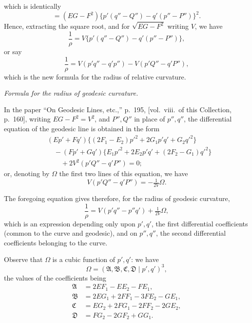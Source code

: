 \documentclass[11pt]{article}
\begin{document}
which is identically
\[
= (EG - F^2)\{p'(q'' - Q'') - q'(p'' - P'')\}^2.
\]
Hence, extracting the square root, and for $\sqrt{EG - F^2}$ writing $V$, we have
\[
\frac{1}{\rho} = V\{p'(q'' - Q'') - q'(p'' - P'')\},
\]
or say
\[
\frac{1}{\rho} = V(p'q'' - q'p'') - V(p'Q'' - q'P''),
\]
which is the new formula for the radius of relative curvature.

\begin{center}\textit{Formula for the radius of geodesic curvature.}\end{center}

In the paper ``On Geodesic Lines, etc.,'' p.\ 195, [vol.\ viii.\ of this Collection, p.\ 160],
writing $EG - F^2 = V^2$, and $P'', Q''$ in place of $p'', q''$, the differential equation of the
geodesic line is obtained in the form
\begin{align*}
& (Ep' + Fq')\{(2F_1 - E_2)p'^2 + 2G_1 p'q' + G_2 q'^2\} \\
& \quad - (Fp' + Gq')\{E_1 p'^2 + 2E_2 p'q' + (2F_2 - G_1)q'^2\} \\
& \quad\quad + 2V^2(p'Q'' - q'P'') = 0;
\end{align*}
or, denoting by $\Omega$ the first two lines of this equation, we have
\[
V(p'Q'' - q'P'') = -\tfrac{1}{2V}\Omega.
\]

The foregoing equation gives therefore, for the radius of geodesic curvature,
\[
\frac{1}{\rho} = V(p'q'' - p''q') + \tfrac{1}{2V}\Omega,
\]
which is an expression depending only upon $p', q'$, the first differential coefficients
(common to the curve and geodesic), and on $p'', q''$, the second differential coefficients
belonging to the curve.

Observe that $\Omega$ is a cubic function of $p', q'$: we have
\[
\Omega = (\mathfrak{A}, \mathfrak{B}, \mathfrak{C}, \mathfrak{D} \mid p', q')^3,
\]
the values of the coefficients being
\begin{align*}
\mathfrak{A} &= 2EF_1 - EE_2 - FE_1, \\
\mathfrak{B} &= 2EG_1 + 2FF_1 - 3FE_2 - GE_1, \\
\mathfrak{C} &= EG_2 + 2FG_1 - 2FF_2 - 2GE_2, \\
\mathfrak{D} &= FG_2 - 2GF_2 + GG_1.
\end{align*}
\end{document}

